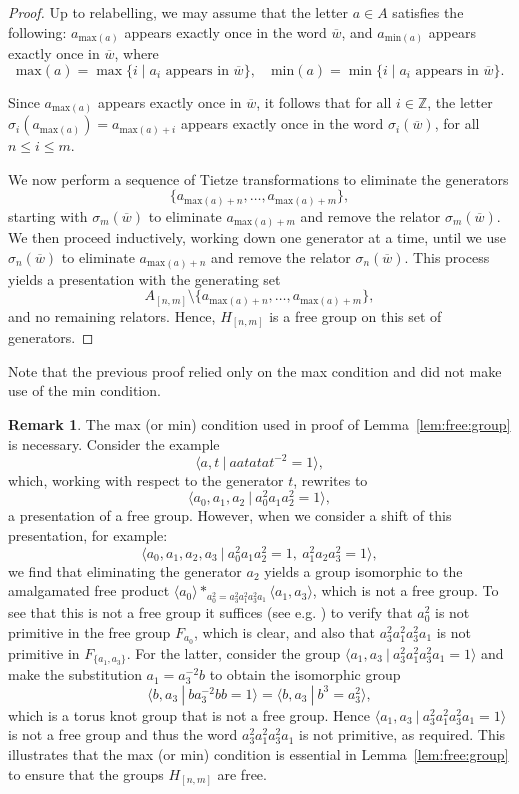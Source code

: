 \documentclass[11pt]{amsart}
\newcommand{\Gpres}[2]{\bigl\langle #1\:|\:#2 \bigr\rangle}
\theoremstyle{plain}
\theoremstyle{definition}
\newtheorem{remark}[theorem]{Remark}
\begin{document}
\begin{proof}
Up to relabelling, we may assume that the letter $a \in A$ satisfies the following: $a_{\mathrm{max}(a)}$ appears exactly once in the word $\overline{w}$, and $a_{\mathrm{min}(a)}$ appears exactly once in $\overline{w}$, where
\[
\mathrm{max}(a) = \max\{ i \mid a_i \text{ appears in } \overline{w} \}, \quad
\mathrm{min}(a) = \min\{ i \mid a_i \text{ appears in } \overline{w} \}.
\]

Since $a_{\mathrm{max}(a)}$ appears exactly once in $\overline{w}$, it follows that for all $i \in \mathbb{Z}$, the letter $\sigma_i(a_{\mathrm{max}(a)}) = a_{\mathrm{max}(a) + i}$ appears exactly once in the word $\sigma_i(\overline{w})$, for all $n \leq i \leq m$.

We now perform a sequence of Tietze transformations to eliminate the generators
\[
\{ a_{\mathrm{max}(a) + n}, \ldots, a_{\mathrm{max}(a) + m} \},
\]
starting with $\sigma_m(\overline{w})$ to eliminate $a_{\mathrm{max}(a) + m}$ and remove the relator $\sigma_m(\overline{w})$. We then proceed inductively, working down one generator at a time, until we use $\sigma_n(\overline{w})$ to eliminate $a_{\mathrm{max}(a) + n}$ and remove the relator $\sigma_n(\overline{w})$. This process yields a presentation with the generating set
\[
A_{[n,m]} \setminus \{ a_{\mathrm{max}(a) + n}, \ldots, a_{\mathrm{max}(a) + m} \},
\]
and no remaining relators. Hence, $H_{[n,m]}$ is a free group on this set of generators.
\end{proof}
Note that the previous proof relied only on the max condition and did not make use of the min condition.

\begin{remark}
The max (or min) condition used in proof of Lemma~\ref{lem:free:group}  is necessary. Consider the example
\[
\Gpres{a,t}{a a t a t a t^{-2}=1},
\]
which, working with respect to the generator $t$, rewrites to
\[
\Gpres{a_0, a_1, a_2}{a_0^2 a_1 a_2^2 = 1},
\]
a presentation of a free group. However, when we consider a shift of this presentation, for example:
\[
\Gpres{a_0, a_1, a_2, a_3}{a_0^2 a_1 a_2^2 = 1,\ a_1^2 a_2 a_3^2 = 1},
\]
we find that eliminating the generator $a_2$ yields a group isomorphic to the amalgamated free product $ \langle a_0 \rangle \ast_{a_0^2 = a_3^2 a_1^2 a_3^2 a_1} \langle a_1, a_3 \rangle$, which is not a free group. 
To see that this is not a free group it suffices (see e.g. \cite[Theorem~1.1(a)]{HOUCINE}) to verify that $a_0^2$ is not primitive in the free group $F_{a_0}$, which is clear, and also that $a_3^2 a_1^2 a_3^2 a_1$ is not primitive in $F_{\{a_1, a_3\}}$. For the latter, consider the group $ \Gpres{a_1, a_3}{a_3^2 a_1^2 a_3^2 a_1=1} $ and make the substitution $a_1 = a_3^{-2} b$ to obtain the isomorphic group  
\[
\Gpres{b, a_3}{b a_3^{-2} b b =1} = 
\Gpres{b, a_3}{b^3 = a_3^2 },  
\]
which is a torus knot group that is not a free group. Hence $ \Gpres{a_1, a_3}{a_3^2 a_1^2 a_3^2 a_1=1} $ is not a free group and thus the word $a_3^2 a_1^2 a_3^2 a_1$ is not primitive, as required.  
This illustrates that the max (or min) condition is essential in Lemma~\ref{lem:free:group} to ensure that the groups $H_{[n,m]}$ are free.
\end{remark}
\end{document}
